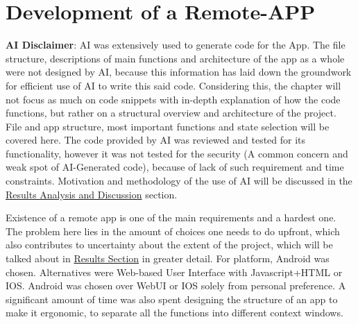 \section{Development of a Remote-APP}\label{sec:FrontendDev}
\textbf{AI Disclaimer}: AI was extensively used to generate  code for the App. The file structure, descriptions of main functions and architecture of the app as a whole were not designed by AI, because this information has laid down the groundwork for efficient use of AI to write this said code. Considering this, the chapter will not focus as much on code snippets with in-depth explanation of how the code functions, but rather on a structural overview and architecture of the project. File and app structure, most important functions and state selection will be covered here. The code provided by AI was reviewed and tested for its functionality, however it was not tested for the security (A common concern and weak spot of AI-Generated code), because of lack of such requirement and time constraints. Motivation and methodology of the use of AI will be discussed in the \hyperref[sec:discussion]{Results Analysis and Discussion} section.

Existence of a remote app is one of the main requirements and a hardest one. The problem here lies in the amount of choices one needs to do upfront, which also contributes to uncertainty about the extent of the project, which will be talked about in \hyperref[sec:discussion]{Results Section} in greater detail. For platform, Android was chosen. Alternatives were Web-based User Interface with Javascript+HTML or IOS. Android was chosen over WebUI or IOS solely from personal preference. A significant amount of time was also spent designing the structure of an app to make it ergonomic, to separate all the functions into different context windows.

